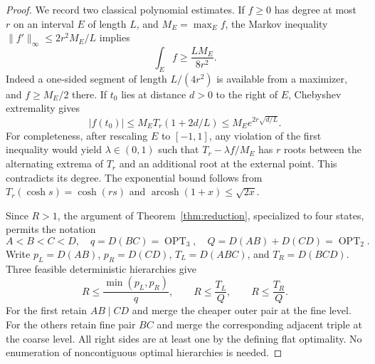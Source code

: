 \documentclass[11pt]{article}
\theoremstyle{remark}\newtheorem{remark}[theorem]{Remark}
\newcommand{\OPT}{\operatorname{OPT}}
\begin{document}
\begin{proof}
We record two classical polynomial estimates. If $f\ge0$ has degree at
most $r$ on an interval $E$ of length $L$, and $M_E=\max_Ef$, the Markov
inequality $\|f'\|_\infty\le2r^2M_E/L$ implies
\begin{equation}
 \int_E f\ge\frac{LM_E}{8r^2}.
 \label{eq:markov}
\end{equation}
Indeed a one-sided segment of length $L/(4r^2)$ is available from a
maximizer, and $f\ge M_E/2$ there. If $t_0$ lies at distance $d>0$ to
the right of $E$, Chebyshev extremality gives
\begin{equation}
 |f(t_0)|\le M_E T_r(1+2d/L)
 \le M_Ee^{2r\sqrt{d/L}}.
 \label{eq:cheb}
\end{equation}
For completeness, after rescaling $E$ to $[-1,1]$, any violation of the
first inequality would yield $\lambda\in(0,1)$ such that
$T_r-\lambda f/M_E$ has $r$ roots between the alternating extrema of
$T_r$ and an additional root at the external point. This contradicts
its degree. The exponential bound follows from
$T_r(\cosh s)=\cosh(rs)$ and
$\operatorname{arcosh}(1+x)\le\sqrt{2x}$.

Since $R>1$, the argument of Theorem~\ref{thm:reduction}, specialized to
four states, permits the notation
\[
 A<B<C<D,\quad q=D(BC)=\OPT_3,\quad
 Q=D(AB)+D(CD)=\OPT_2.
\]
Write $p_L=D(AB)$, $p_R=D(CD)$, $T_L=D(ABC)$, and $T_R=D(BCD)$.
Three feasible deterministic hierarchies give
\begin{equation}
 R\le\frac{\min(p_L,p_R)}q,\qquad
 R\le\frac{T_L}Q,\qquad R\le\frac{T_R}Q.
 \label{eq:candidates}
\end{equation}
For the first retain $AB\mid CD$ and merge the cheaper outer pair at
the fine level. For the others retain fine pair $BC$ and merge the
corresponding adjacent triple at the coarse level. All right sides
are at least one by the defining flat optimality. No enumeration of
noncontiguous optimal hierarchies is needed.


\end{proof}
\end{document}
